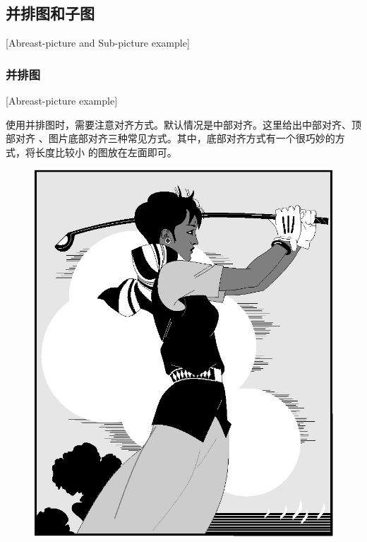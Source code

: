 \subsection{并排图和子图}[Abreast-picture and Sub-picture example]
\subsubsection{并排图}[Abreast-picture example]

使用并排图时，需要注意对齐方式。默认情况是中部对齐。这里给出中部对齐、顶部对齐
、图片底部对齐三种常见方式。其中，底部对齐方式有一个很巧妙的方式，将长度比较小
的图放在左面即可。

\begin{figure}[htbp]
  \centering
  \begin{minipage}{0.4\textwidth}
    \centering
    \includegraphics[width=\textwidth]{golfer}
  \end{minipage}
  \centering
  \begin{minipage}{0.4\textwidth}
    \centering

\end{minipage}
\end{figure}
